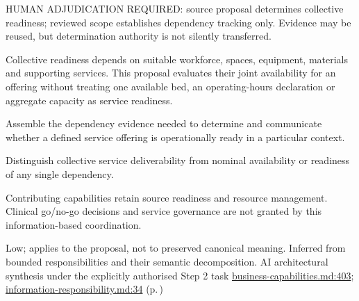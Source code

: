 HUMAN ADJUDICATION REQUIRED: source proposal determines collective readiness; reviewed scope establishes dependency tracking only. Evidence may be reused, but determination authority is not silently transferred.



Collective readiness depends on suitable workforce, spaces, equipment, materials and supporting services. This proposal evaluates their joint availability for an offering without treating one available bed, an operating-hours declaration or aggregate capacity as service readiness.



Assemble the dependency evidence needed to determine and communicate whether a defined service offering is operationally ready in a particular context.



Distinguish collective service deliverability from nominal availability or readiness of any single dependency.



Contributing capabilities retain source readiness and resource management. Clinical go/\allowbreak{}no-go decisions and service governance are not granted by this information-based coordination.


Low; applies to the proposal, not to preserved canonical meaning.
Inferred from bounded responsibilities and their semantic decomposition. AI architectural synthesis under the explicitly authorised Step 2 task \hyperref[evidence:a4c0900c47c945d9]{business-capabilities.md:403}; \hyperref[evidence:be61392fefb4bb10]{information-responsibility.md:34}
 (p.\,\pageref{cap:bec-reviewed-clinical-service-dependency-management})
